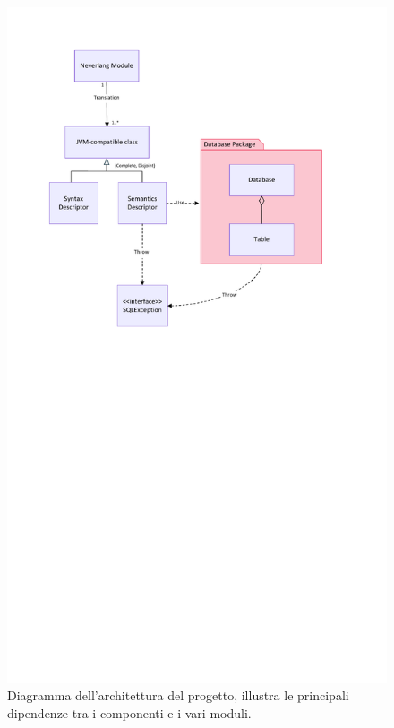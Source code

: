 \documentclass[12pt,a4paper,openright,twoside]{book}
\begin{document}
\begin{figure}
\centering
\includegraphics[width=.8\linewidth]{figures/architecture.pdf}
\caption{Diagramma dell’architettura del progetto, illustra le principali dipendenze tra i componenti e i vari moduli.}
\label{fig:architecture}
\end{figure}
\end{document}
